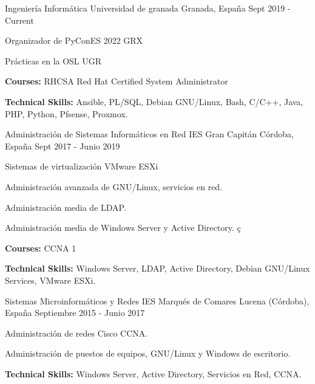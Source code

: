 

\begin{cventries}

  \cventry
    {Ingeniería Informática} %
    {Universidad de granada} %
    {Granada, España} %
    {Sept 2019 - Current} %
    {
      \begin{cvitems} %
        \item {Organizador de PyConES 2022 GRX}
        \item {Prácticas en la OSL UGR}
        \item {\textbf{Courses:} RHCSA Red Hat Certified System Administrator}
        \item {\textbf{Technical Skills:} Ansible, PL/SQL, Debian GNU/Linux, Bash, C/C++, Java, PHP, Python, Pfsense, Proxmox.}
      \end{cvitems}
    }
    
  \cventry
    {Administración de Sistemas Informáticos en Red} %
    {IES Gran Capitán} %
    {Córdoba, España} %
    {Sept 2017 - Junio 2019} %
    {
      \begin{cvitems} %
        \item {Sistemas de virtualización VMware ESXi}
        \item {Administración avanzada de GNU/Linux, servicios en red.}
        \item {Administración media de LDAP.} 
        \item {Administración media de Windows Server y Active Directory.} ç
        \item {\textbf{Courses:} CCNA 1}
        \item {\textbf{Technical Skills:} Windows Server, LDAP, Active Directory, Debian GNU/Linux Services, VMware ESXi.}
      \end{cvitems}
    }
    
  \cventry
    {Sistemas Microinformáticos y Redes} %
    {IES Marqués de Comares} %
    {Lucena (Córdoba), España} %
    {Septiembre 2015 - Junio 2017} %
    {
      \begin{cvitems} %
        \item {Administración de redes Cisco CCNA.}
        \item {Administración de puestos de equipos, GNU/Linux y Windows de escritorio.}
        \item {\textbf{Technical Skills:} Windows Server, Active Directory, Servicios en Red, CCNA.}
      \end{cvitems}
    }
\end{cventries}
